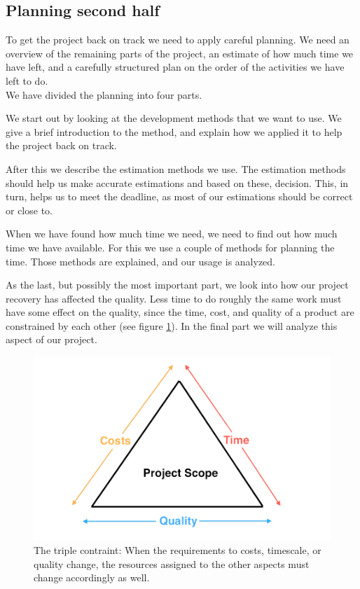 \subsection{Planning second half}
To get the project back on track we need to apply careful planning. We need an overview of the remaining parts of the project, an estimate of how much time we have left, and a carefully structured plan on the order of the activities we have left to do.\\
We have divided the planning into four parts.

We start out by looking at the development methods that we want to use. We give a brief introduction to the method, and explain how we applied it to help the project back on track.

After this we describe the estimation methods we use. The estimation methods should help us make accurate estimations and based on these, decision. This, in turn, helps us to meet the deadline, as most of our estimations should be correct or close to.

When we have found how much time we need, we need to find out how much time we have available. For this we use a couple of methods for planning the time. Those methods are explained, and our usage is analyzed.

As the last, but possibly the most important part, we look into how our project recovery has affected the quality. Less time to do roughly the same work must have some effect on the quality, since the time, cost, and quality of a product are constrained by each other (see figure \ref{fig:timeCostsQuality})\cite[p. 191]{PM}. In the final part we will analyze this aspect of our project.

\begin{figure}[H]
  \includegraphics[width=\textwidth]{illustrations/timeCostsQuality}
  \caption{The triple contraint: When the requirements to costs, timescale, or quality change, the resources assigned to the other aspects must change accordingly as well.}
  \label{fig:timeCostsQuality}
\end{figure}